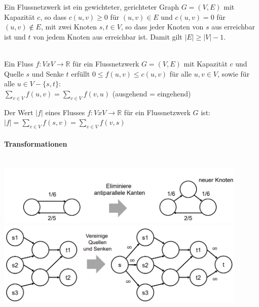 \documentclass[
    ngerman,
    color=3b,
    dark_mode,
    load_common, %
    summary,
    boxarc,
]{tuda_summary}
\begin{document}
\begin{definition}[Flussnetzwerk]
    Ein Flussnetzwerk ist ein gewichteter, gerichteter Graph $G=(V,E)$ mit Kapazität $c$, so dass
    $c(u,v) \geq 0$ für $(u,v) \in E$ und $c(u,v) = 0$ für $(u,v) \notin E$, mit zwei Knoten $s,t \in V$,
    so dass jeder Knoten von $s$ aus erreichbar ist und $t$ von jedem Knoten aus erreichbar ist.
    Damit gilt $|E| \geq |V| - 1$.
\end{definition}
\begin{definition}[Fluss]\mbox{}\\
    Ein Fluss $f: V x V \rightarrow \mathbb{R}$ für ein Flussnetzwerk $G = (V,E)$ mit Kapazität $c$
    und Quelle $s$ und Senke $t$ erfüllt $0 \leq f(u,v) \leq c(u,v)$ für alle $u,v \in V$, sowie für alle
    $u \in V - \{s,t\}$: \\
    $\sum_{v\in V} f(u,v) = \sum_{v\in V} f(v,u)$ (ausgehend = eingehend)
\end{definition}
\begin{definition}
    Der Wert $|f|$ eines Flusses $f: V x V \rightarrow \mathbb{R}$ für ein Flussnetzwerk $G$ ist: \\
    $|f| = \sum_{v\in V} f(s,v) = \sum_{v\in V} f(v,s)$
\end{definition}

\paragraph{Transformationen}\mbox{}\vspace{1em}\\
\includegraphics[width=12cm]{pictures/flussTrans1.PNG}\vspace{1em}\\
\includegraphics[width=12cm]{pictures/flussTrans2.PNG}
\end{document}
